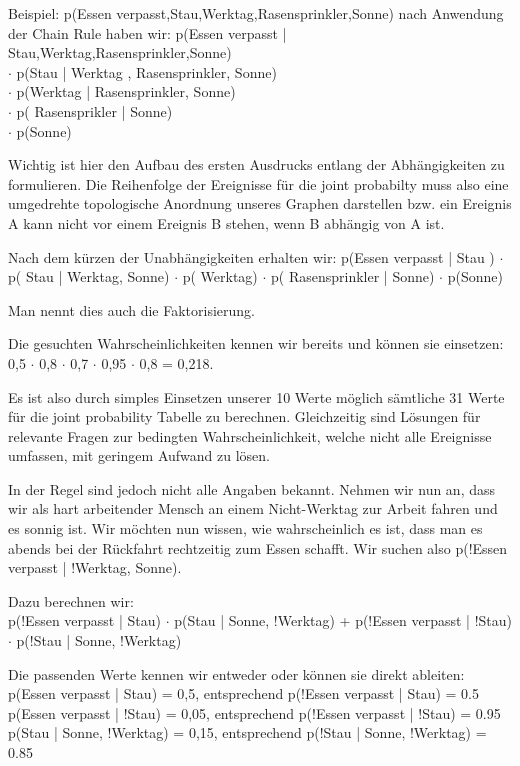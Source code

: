 Beispiel:
p(Essen verpasst,Stau,Werktag,Rasensprinkler,Sonne)
nach Anwendung der Chain Rule haben wir:
p(Essen verpasst | Stau,Werktag,Rasensprinkler,Sonne) \\ $\cdot$ p(Stau | Werktag , Rasensprinkler, Sonne) \\ $\cdot$ p(Werktag | Rasensprinkler, Sonne)
\\ $\cdot$ p( Rasensprikler | Sonne)
\\ $\cdot$ p(Sonne)

Wichtig ist hier den Aufbau des ersten Ausdrucks entlang der Abhängigkeiten zu formulieren. Die Reihenfolge der Ereignisse für die joint probabilty muss also eine umgedrehte topologische Anordnung unseres Graphen darstellen bzw. ein Ereignis A kann nicht vor einem Ereignis B stehen, wenn B abhängig von A ist.

Nach dem kürzen der Unabhängigkeiten erhalten wir:
p(Essen verpasst | Stau ) $\cdot$ p( Stau | Werktag, Sonne) $\cdot$ p( Werktag) $\cdot$ p( Rasensprinkler | Sonne) $\cdot$ p(Sonne)

Man nennt dies auch die Faktorisierung.

Die gesuchten Wahrscheinlichkeiten kennen wir bereits und können sie einsetzen:
0,5 $\cdot$ 0,8 $\cdot$ 0,7 $\cdot$ 0,95 $\cdot$ 0,8 = 0,218.

Es ist also durch simples Einsetzen unserer 10 Werte möglich sämtliche 31 Werte für die joint probability Tabelle zu berechnen.
Gleichzeitig sind Lösungen für relevante Fragen zur bedingten Wahrscheinlichkeit, welche nicht alle Ereignisse umfassen, mit geringem Aufwand zu lösen.


In der Regel sind jedoch nicht alle Angaben bekannt.
Nehmen wir nun an, dass wir als hart arbeitender Mensch an einem Nicht-Werktag zur Arbeit fahren und es sonnig ist.
Wir möchten nun wissen, wie wahrscheinlich es ist, dass man es abends bei der Rückfahrt rechtzeitig zum Essen schafft.
Wir suchen also p(!Essen verpasst | !Werktag, Sonne).

Dazu berechnen wir:\\
p(!Essen verpasst | Stau) $\cdot$ p(Stau | Sonne, !Werktag) + p(!Essen verpasst | !Stau) $\cdot$ p(!Stau | Sonne, !Werktag)

Die passenden Werte kennen wir entweder oder können sie direkt ableiten:\\
p(Essen verpasst | Stau) = 0,5, entsprechend p(!Essen verpasst | Stau) = 0.5\\
p(Essen verpasst | !Stau) = 0,05, entsprechend p(!Essen verpasst | !Stau) = 0.95\\
p(Stau | Sonne, !Werktag) = 0,15, entsprechend p(!Stau | Sonne, !Werktag) = 0.85\\

